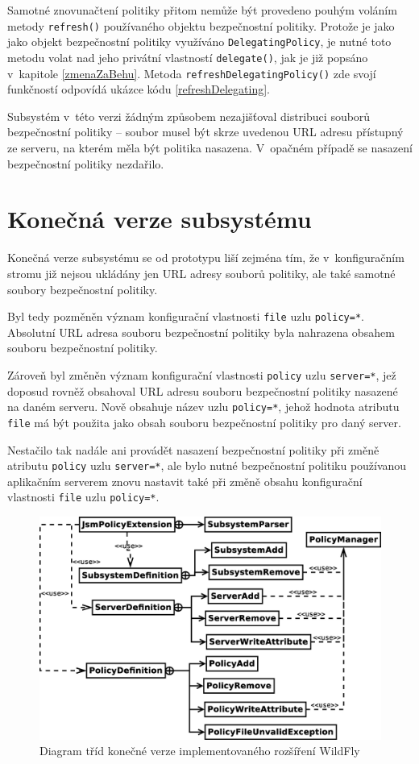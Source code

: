 Samotné znovunačtení politiky přitom nemůže být provedeno pouhým voláním metody {\tt refresh()} používaného objektu bezpečnostní politiky.
Protože je jako jako objekt bezpečnostní politiky využíváno {\tt DelegatingPolicy}, je nutné toto metodu volat nad jeho privátní vlastností {\tt delegate()},
jak je již popsáno v~kapitole \ref{zmenaZaBehu}. Metoda {\tt refreshDelegatingPolicy()} zde svojí funkčností odpovídá ukázce kódu \ref{refreshDelegating}.

Subsystém v~této verzi žádným způsobem nezajišťoval distribuci souborů bezpečnostní politiky -- soubor musel být skrze uvedenou URL adresu přístupný ze serveru, na kterém měla být politika nasazena. V~opačném případě se nasazení bezpečnostní politiky nezdařilo.

\section{Konečná verze subsystému}

Konečná verze subsystému se od prototypu liší zejména tím, že v~konfiguračním stromu již nejsou ukládány jen URL adresy souborů politiky, ale také samotné soubory bezpečnostní politiky.

Byl tedy pozměněn význam konfigurační vlastnosti {\tt file} uzlu {\tt policy=*}. Absolutní URL adresa souboru bezpečnostní politiky byla nahrazena obsahem souboru bezpečnostní politiky.

Zároveň byl změněn význam konfigurační vlastnosti {\tt policy} uzlu {\tt server=*}, jež doposud rovněž obsahoval URL adresu souboru bezpečnostní politiky nasazené na daném serveru.
Nově obsahuje název uzlu {\tt policy=*}, jehož hodnota atributu {\tt file} má být použita jako obsah souboru bezpečnostní politiky pro daný server.

Nestačilo tak nadále ani provádět nasazení bezpečnostní politiky při změně atributu {\tt policy} uzlu {\tt server=*}, ale bylo nutné bezpečnostní politiku používanou aplikačním serverem znovu nastavit také při změně obsahu konfigurační vlastnosti {\tt file} uzlu {\tt policy=*}.

\begin{figure}[ht]
  \centering
  \includegraphics[width=12cm]{fig/tridy2}
  \caption{Diagram tříd konečné verze implementovaného rozšíření WildFly}
  \label{tridy2}
\end{figure}

